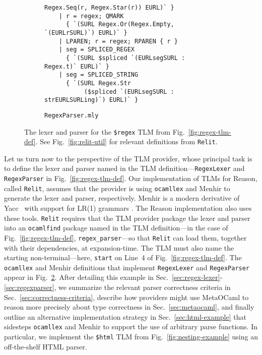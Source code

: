 \documentclass[acmsmall]{acmart}
\newcommand{\li}[1]{\lstinline[basicstyle=\ttfamily\fontsize{9pt}{1em}\selectfont]{#1}}
\begin{document}
\begin{figure}
\begin{subfigure}[t]{0.61\textwidth}
\begin{lstlisting}[morekeywords={token,left,start},stringstyle=\ttfamily\color{black}]
           Regex.Seq(r, Regex.Star(r)) EURL)` }
    | r = regex; QMARK 
      { `(SURL Regex.Or(Regex.Empty, `(EURLrSURL)`) EURL)` }
    | LPAREN; r = regex; RPAREN { r }
    | seg = SPLICED_REGEX 
      { `(SURL $spliced `(EURLsegSURL : Regex.t)` EURL)` }
    | seg = SPLICED_STRING 
      { `(SURL Regex.Str
           ($spliced `(EURLsegSURL : strEURLSURLing)`) EURL)` }
\end{lstlisting}
\vspace{-5px}
\caption{\li{RegexParser.mly}}
\label{fig:regex-parser}
\end{subfigure}
\vspace{1px}
\caption{The lexer and parser for the \li{$regex} TLM from Fig.~\ref{fig:regex-tlm-def}. See Fig.~\ref{fig:relit-util} for relevant definitions from \li{Relit}.}
\label{fig:lexer-and-parser}
\vspace{-7px}
\end{figure}

Let us turn now to the perspective of the TLM provider, whose principal task is to define the lexer and parser named in the TLM definition---\li{RegexLexer} and \li{RegexParser} in Fig.~\ref{fig:regex-tlm-def}. Our implementation of TLMs for Reason, called \li{Relit}, assumes that the provider is using \li{ocamllex} \cite{ocaml-manual} and Menhir  \cite{pottier2016menhir} to generate the lexer and parser, respectively. Menhir is a modern derivative of Yacc~\cite{johnson1975yacc,TarditiDR:mly} with support for LR(1) grammars \cite{jourdan2012validating}. The Reason implementation also uses these tools. \li{Relit} requires that the TLM provider package the lexer and parser into an \li{ocamlfind} package named in the TLM definition---in the case of Fig.~\ref{fig:regex-tlm-def}, \li{regex_parser}---so that \li{Relit} can load them, together with their dependencies, at expansion-time. The TLM must also name the starting non-terminal---here, \li{start} on Line~4 of Fig.~\ref{fig:regex-tlm-def}. 
The \li{ocamllex} and Menhir definitions that implement \li{RegexLexer} and \li{RegexParser} appear in Fig.~\ref{fig:lexer-and-parser}. 
After detailing this example in Sec.~\ref{sec:regex-lexer}-\ref{sec:regexparser}, we summarize the relevant parser correctness criteria in Sec.~\ref{sec:correctness-criteria}, describe how providers might use MetaOCaml to reason more precisely about type correctness in Sec.~\ref{sec:metaocaml}, and finally outline an alternative implementation strategy in Sec.~\ref{sec:html-example} that sidesteps \li{ocamllex} and Menhir to support the use of arbitrary parse functions. In particular, we implement the \li{$html} TLM from Fig.~\ref{fig:nesting-example} using an off-the-shelf HTML parser.
\end{document}
